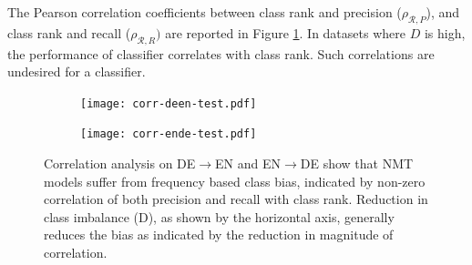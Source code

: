 The Pearson correlation coefficients between class rank and precision ($\rho_{\mathcal{R}, P}$), and class rank and recall ($\rho_{\mathcal{R}, R})$ are reported in Figure \ref{fig:corr-deen-test}.
In datasets where $D$ is high, the performance of classifier correlates with class rank. Such correlations are undesired for a classifier.

\begin{figure}[ht]
\begin{subfigure}{0.495\linewidth}
    \centering
    \texttt{[image: corr-deen-test.pdf]}
\end{subfigure}
\begin{subfigure}{0.495\linewidth}
    \texttt{[image: corr-ende-test.pdf]}
\end{subfigure}
        \caption{Correlation analysis on DE$\rightarrow$EN and EN$\rightarrow$DE show that NMT models suffer from frequency based class bias, indicated by non-zero correlation of both precision and recall with class rank.
        Reduction in class imbalance (D), as shown by the horizontal axis, generally reduces the bias as indicated by the reduction in magnitude of correlation.}
         \label{fig:corr-deen-test}
\end{figure}




